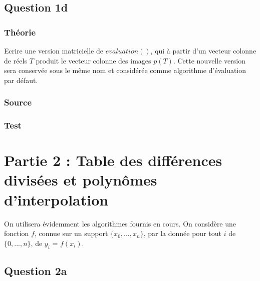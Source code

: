 \documentclass[a4paper,10pt]{report}
\begin{document}
\section*{Question 1d}

\subsection*{Théorie}

Ecrire une version matricielle de $evaluation()$, qui à partir d’un vecteur
colonne de réels $T$ produit le vecteur colonne des images $p(T)$. Cette nouvelle
version sera conservée sous le même nom et considérée comme algorithme
d’évaluation par défaut.

\subsection*{Source}



\subsection*{Test}

\begin{center}
	
\end{center}

\chapter*{Partie 2 : Table des différences divisées et polynômes d’interpolation}

On utilisera évidemment les algorithmes fournis en cours. On considère une
fonction $f$, connue sur un support $\lbrace x_{0},...,x_{n}\rbrace$, par la donnée pour tout $i$ de $\lbrace 0,...,n \rbrace$, de $y_{i}$ = $f(x_{i})$.

\section*{Question 2a}
\end{document}
